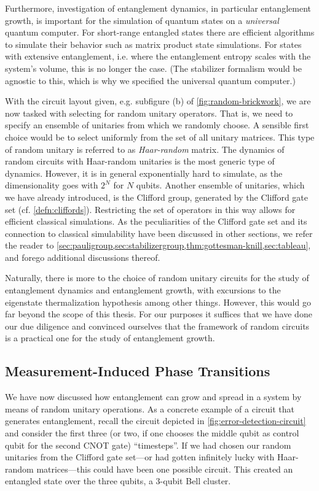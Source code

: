 Furthermore, investigation of entanglement dynamics, in
particular entanglement growth, is important for the simulation of quantum
states on a \emph{universal} quantum computer. For short-range entangled states
there are efficient algorithms to simulate their behavior such as matrix
product state simulations. For states with extensive entanglement, i.e. where
the entanglement entropy scales with the system's volume, this is no
longer the case. (The stabilizer formalism would be agnostic to this, which is
why we specified the universal quantum computer.)

With the circuit layout given, e.g. subfigure (b) of
\cref{fig:random-brickwork}, we are now tasked with selecting for random
unitary operators. That is, we need to specify an ensemble of unitaries from
which we randomly choose. A sensible first choice would be to select uniformly
from the set of all unitary matrices. This type of random unitary is referred
to as \emph{Haar-random} matrix. The dynamics of random circuits with
Haar-random unitaries is the most generic type of dynamics. However, it is in
general exponentially hard to simulate, as the dimensionality goes with $2^N$
for $N$ qubits. Another ensemble of unitaries, which we have already
introduced, is the Clifford group, generated by the Clifford gate set (cf.
\cref{defn:cliffords}). Restricting the set of operators in this way allows for
efficient classical simulations. As the peculiarities of the Clifford gate set
and its connection to classical simulability have been discussed in other
sections, we refer the reader to
\cref{sec:pauligroup,sec:stabilizergroup,thm:gottesman-knill,sec:tableau}, and
forego additional discussions thereof. 

Naturally, there is more to the choice of random unitary circuits for the study
of entanglement dynamics and entanglement growth, with excursions to the
eigenstate thermalization hypothesis among other things. However, this would go
far beyond the scope of this thesis. For our purposes it suffices that we have
done our due diligence and convinced ourselves that the framework of random
circuits is a practical one for the study of entanglement growth.

\subsection{Measurement-Induced Phase Transitions}\label{sec:mipt}

We have now discussed how entanglement can grow and spread in a system by means
of random unitary operations. As a concrete example of a circuit that generates
entanglement, recall the circuit depicted in
\cref{fig:error-detection-circuit} and consider the first three (or two,
if one chooses the middle qubit as control qubit for the second CNOT gate)
\enquote{timesteps}. If we had chosen our random unitaries from the Clifford
gate set---or had gotten infinitely lucky with Haar-random matrices---this could
have been one possible circuit. This created an entangled state over the three
qubits, a 3-qubit Bell cluster. 

